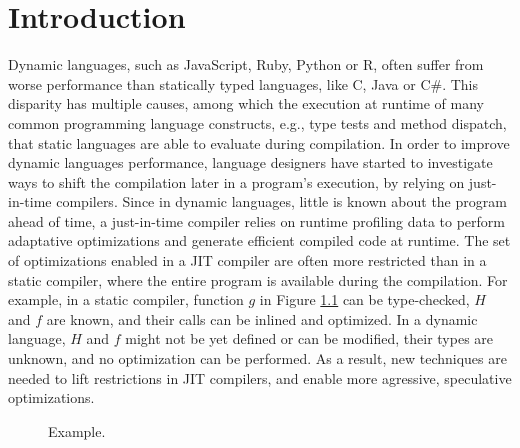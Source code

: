 
\chapter{Introduction} %

\label{Chapter1} %


\newcommand{\keyword}[1]{\textbf{#1}}
\newcommand{\tabhead}[1]{\textbf{#1}}
\newcommand{\code}[1]{\texttt{#1}}
\newcommand{\file}[1]{\texttt{\bfseries#1}}
\newcommand{\option}[1]{\texttt{\itshape#1}}


Dynamic languages, such as JavaScript, Ruby, Python or R, often suffer from worse performance than statically typed languages, like C, Java or C\#.
This disparity has multiple causes, among which the execution at runtime of many common programming language constructs, e.g., type tests and method dispatch, that static languages are able to evaluate during compilation.
In order to improve dynamic languages performance, language designers have started to investigate ways to shift the compilation later in a program's execution, by relying on just-in-time compilers.
Since in dynamic languages, little is known about the program ahead of time, a just-in-time compiler relies on runtime profiling data to perform adaptative optimizations and generate efficient compiled code at runtime.
The set of optimizations enabled in a JIT compiler are often more restricted than in a static compiler, where the entire program is available during the compilation.
For example, in a static compiler, function $g$ in Figure \ref{fig:example} can be type-checked, $H$ and $f$ are known, and their calls can be inlined and optimized.
In a dynamic language, $H$ and $f$ might not be yet defined or can be modified, their types are unknown, and no optimization can be performed.
As a result, new techniques are needed to lift restrictions in JIT compilers, and enable more agressive, speculative optimizations.\\

\begin{figure}[h]
\caption{Example.}
\label{fig:example}
\end{figure}

